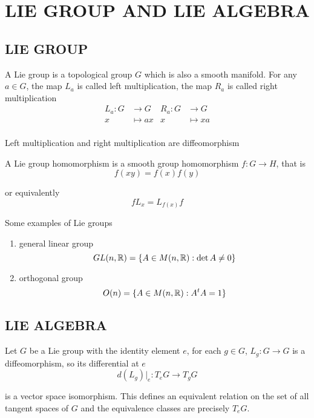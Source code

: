 \section{LIE GROUP AND LIE ALGEBRA}

\subsection{LIE GROUP}

\begin{definition}
	A Lie group is a topological group $G$ which is also a smooth manifold. For any $a \in G$, the map $L_a$ is called left multiplication, the map $R_a$ is called right multiplication
	\begin{align*}
		L_a: G &\to G &R_a: G &\to G \\
		x &\mapsto ax &x &\mapsto  xa \\
	\end{align*}
	
	Left multiplication and right multiplication are diffeomorphism
\end{definition}

\begin{definition}
	A Lie group homomorphism is a smooth group homomorphism $f: G \to H$, that is
	$$
		f(xy) = f(x) f(y)
	$$
	
	or equivalently
	$$
		f L_x = L_{f(x)} f
	$$
\end{definition}

\begin{remark}
	Some examples of Lie groups
	\begin{enumerate}
		\item general linear group
		$$
			GL(n, \mathbb{R}) = \{A \in M(n, \mathbb{R}): \det A \neq 0\}
		$$
		
		\item orthogonal group
		$$
			O(n) = \{A \in M(n, \mathbb{R}): A^t A = 1\}
		$$
	\end{enumerate}
\end{remark}

\subsection{LIE ALGEBRA}

\begin{remark}
	Let $G$ be a Lie group with the identity element $e$, for each $g \in G$, $L_g: G \to G$ is a diffeomorphism, so its differential at $e$ 
	$$
	d(L_g)\vert_e: T_e G \to T_g G
	$$ 
	
	is a vector space isomorphism. This defines an equivalent relation on the set of all tangent spaces of $G$ and the equivalence classes are precisely $T_e G$.
\end{remark}

